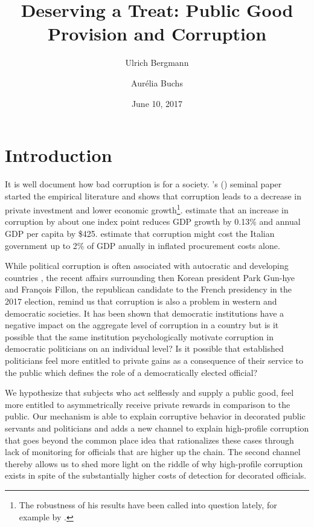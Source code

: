 \documentclass[12pt, a4paper]{article}
\begin{document}
\onehalfspacing

\title{Deserving a Treat: Public Good Provision and Corruption}
\author{Ulrich Bergmann \and Aurélia Buchs}
\date{June 10, 2017}

\maketitle

\section{Introduction}
It is well document how bad corruption is for a society. \citeauthor{Mauro1995Corruption}'s (\citeyear{Mauro1995Corruption}) seminal paper started the empirical literature and shows that corruption leads to a decrease in private investment and lower economic growth\footnote{The robustness of his results have been called into question lately, for example by \citet{Svensson2005Eight}.}. \citet{Dreher2005Economic} estimate that an increase in corruption by about one index point reduces GDP growth by 0.13\% and annual GDP per capita by \$425. \citet{Bandiera2009Active} estimate that corruption might cost the Italian government up to 2\% of GDP anually in inflated procurement costs alone.

While political corruption is often associated with autocratic and developing countries \citep{Serra2006Empirical}, the recent affairs surrounding then Korean president Park Gun-hye and François Fillon, the republican candidate to the French presidency in the 2017 election, remind us that corruption is also a problem in western and democratic societies. It has been shown that democratic institutions have a negative impact on the aggregate level of corruption in a country \citep{Serra2006Empirical} but is it possible that the same institution psychologically motivate corruption in democratic politicians on an individual level? Is it possible that established politicians feel more entitled to private gains as a consequence of their service to the public which defines the role of a democratically elected official?

We hypothesize that subjects who act selflessly and supply a public good, feel more entitled to asymmetrically receive private rewards in comparison to the public. Our mechanism is able to explain corruptive behavior in decorated public servants and politicians and adds a new channel to explain high-profile corruption that goes beyond the common place idea that rationalizes these cases through lack of monitoring for officials that are higher up the chain. The second channel thereby allows us to shed more light on the riddle of why high-profile corruption exists in spite of the substantially higher costs of detection for decorated officials.
\end{document}
